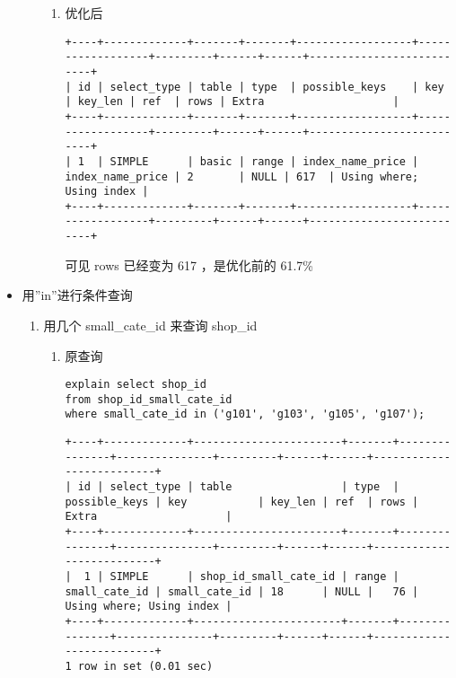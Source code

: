 \documentclass[11pt]{article}
\begin{document}
\begin{itemize}
\begin{enumerate}
\begin{enumerate}
\item 优化后

\begin{verbatim}
+----+-------------+-------+-------+------------------+------------------+---------+------+------+--------------------------+
| id | select_type | table | type  | possible_keys    | key              | key_len | ref  | rows | Extra                    |
+----+-------------+-------+-------+------------------+------------------+---------+------+------+--------------------------+
| 1  | SIMPLE      | basic | range | index_name_price | index_name_price | 2       | NULL | 617  | Using where; Using index |
+----+-------------+-------+-------+------------------+------------------+---------+------+------+--------------------------+
\end{verbatim}

可见 rows 已经变为 617 ，是优化前的 61.7\%
\end{enumerate}
\end{enumerate}
\item 用”in”进行条件查询
\label{sec-3-2-1-7}
\begin{enumerate}
\item 用几个 small\_cate\_id 来查询 shop\_id
\begin{enumerate}
\item 原查询

\begin{lstlisting}
explain select shop_id
from shop_id_small_cate_id
where small_cate_id in ('g101', 'g103', 'g105', 'g107');
\end{lstlisting}

\begin{verbatim}
+----+-------------+-----------------------+-------+---------------+---------------+---------+------+------+--------------------------+
| id | select_type | table                 | type  | possible_keys | key           | key_len | ref  | rows | Extra                    |
+----+-------------+-----------------------+-------+---------------+---------------+---------+------+------+--------------------------+
|  1 | SIMPLE      | shop_id_small_cate_id | range | small_cate_id | small_cate_id | 18      | NULL |   76 | Using where; Using index |
+----+-------------+-----------------------+-------+---------------+---------------+---------+------+------+--------------------------+
1 row in set (0.01 sec)
\end{verbatim}


\end{enumerate}
\end{enumerate}
\end{itemize}
\end{document}
